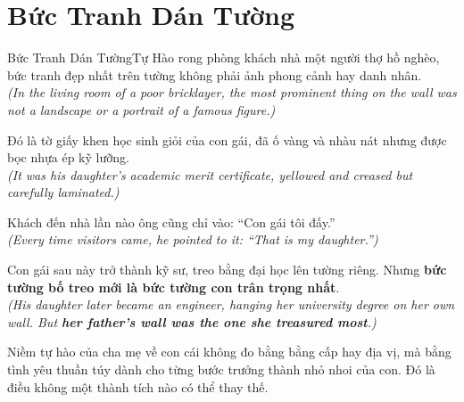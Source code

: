 \section{Bức Tranh Dán Tường}
\begin{truyen}{Bức Tranh Dán Tường}{Tự Hào}
rong phòng khách nhà một người thợ hồ nghèo, bức tranh đẹp nhất trên tường không phải ảnh phong cảnh hay danh nhân.\\
\textit{(In the living room of a poor bricklayer, the most prominent thing on the wall was not a landscape or a portrait of a famous figure.)}

Đó là tờ giấy khen học sinh giỏi của con gái, đã ố vàng và nhàu nát nhưng được bọc nhựa ép kỹ lưỡng.\\
\textit{(It was his daughter's academic merit certificate, yellowed and creased but carefully laminated.)}

Khách đến nhà lần nào ông cũng chỉ vào: ``Con gái tôi đấy.''\\
\textit{(Every time visitors came, he pointed to it: ``That is my daughter.'')}

Con gái sau này trở thành kỹ sư, treo bằng đại học lên tường riêng. Nhưng \textbf{bức tường bố treo mới là bức tường con trân trọng nhất}.\\
\textit{(His daughter later became an engineer, hanging her university degree on her own wall. But \textbf{her father's wall was the one she treasured most}.)}
\end{truyen}
\begin{baihoc}
  Niềm tự hào của cha mẹ về con cái không đo bằng bằng cấp hay địa vị, mà bằng tình yêu thuần túy dành cho từng bước trưởng thành nhỏ nhoi của con. Đó là điều không một thành tích nào có thể thay thế.
\end{baihoc}

